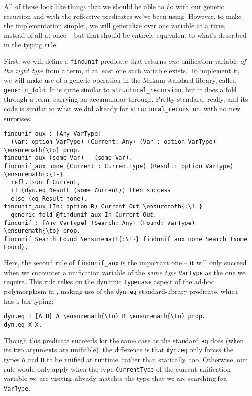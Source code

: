All of those look like things that we should be able to do with our
generic recursion and with the reflective predicates we've been using!
However, to make the implementation simpler, we will generalize over one
variable at a time, instead of all at once -- but that should be
entirely equivalent to what's described in the typing rule.

First, we will define a \texttt{findunif} predicate that returns
\emph{one} unification variable \emph{of the right type} from a term, if
at least one such variable exists. To implement it, we will make use of
a generic operation in the Makam standard library, called
\texttt{generic\_fold}. It is quite similar to
\texttt{structural\_recursion}, but it does a fold through a term,
carrying an accumulator through. Pretty standard, really, and its code
is similar to what we did already for \texttt{structural\_recursion},
with no new surprises.

\begin{verbatim}
findunif_aux : [Any VarType]
  (Var: option VarType) (Current: Any) (Var': option VarType) \ensuremath{\to} prop.
findunif_aux (some Var) _ (some Var).
findunif_aux none (Current : CurrentType) (Result: option VarType) \ensuremath{:\!-}
  refl.isunif Current,
  if (dyn.eq Result (some Current)) then success
  else (eq Result none).
findunif_aux (In: option B) Current Out \ensuremath{:\!-}
  generic_fold @findunif_aux In Current Out.
findunif : [Any VarType] (Search: Any) (Found: VarType) \ensuremath{\to} prop.
findunif Search Found \ensuremath{:\!-} findunif_aux none Search (some Found).
\end{verbatim}

Here, the second rule of \texttt{findunif\_aux} is the important one --
it will only succeed when we encounter a unification variable of the
\emph{same type} \texttt{VarType} as the one we require. This rule
relies on the dynamic \texttt{typecase} aspect of the ad-hoc
polymorphism in \lamprolog, making use of the \texttt{dyn.eq}
standard-library predicate, which has a lax typing:

\begin{verbatim}
dyn.eq : [A B] A \ensuremath{\to} B \ensuremath{\to} prop.
dyn.eq X X.
\end{verbatim}

Though this predicate succeeds for the same case as the standard
\texttt{eq} does (when its two arguments are unifiable), the difference
is that \texttt{dyn.eq} only forces the types \texttt{A} and \texttt{B}
to be unified at runtime, rather than statically, too. Otherwise, our
rule would only apply when the type \texttt{CurrentType} of the current
unification variable we are visiting already matches the type that we
are searching for, \texttt{VarType}.

